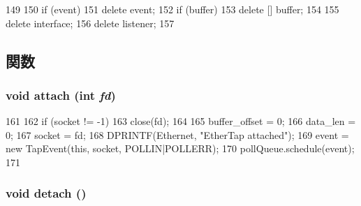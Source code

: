 \begin{DoxyCode}
149 {
150     if (event)
151         delete event;
152     if (buffer)
153         delete [] buffer;
154 
155     delete interface;
156     delete listener;
157 }
\end{DoxyCode}


\subsection{関数}
\hypertarget{classEtherTap_a9b8a915c2058dbc784c223ff9b93f1a5}{
\subsubsection[{attach}]{\setlength{\rightskip}{0pt plus 5cm}void attach (int {\em fd})}}
\label{classEtherTap_a9b8a915c2058dbc784c223ff9b93f1a5}



\begin{DoxyCode}
161 {
162     if (socket != -1)
163         close(fd);
164 
165     buffer_offset = 0;
166     data_len = 0;
167     socket = fd;
168     DPRINTF(Ethernet, "EtherTap attached\n");
169     event = new TapEvent(this, socket, POLLIN|POLLERR);
170     pollQueue.schedule(event);
171 }
\end{DoxyCode}
\hypertarget{classEtherTap_ac295bade8aee589f6718dfa79edc2a34}{
\subsubsection[{detach}]{\setlength{\rightskip}{0pt plus 5cm}void detach ()}}
\label{classEtherTap_ac295bade8aee589f6718dfa79edc2a34}



